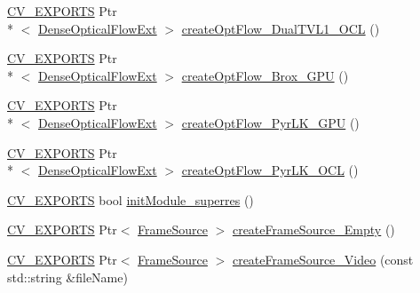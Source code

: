 \begin{DoxyCompactItemize}
\item 
\hyperlink{core_2types__c_8h_a1bf9f0e121b54272da02379cfccd0a2b}{C\-V\-\_\-\-E\-X\-P\-O\-R\-T\-S} Ptr\\*
$<$ \hyperlink{classcv_1_1superres_1_1DenseOpticalFlowExt}{Dense\-Optical\-Flow\-Ext} $>$ \hyperlink{namespacecv_1_1superres_a47e90b4ea3a038998eae7a47030b64fa}{create\-Opt\-Flow\-\_\-\-Dual\-T\-V\-L1\-\_\-\-O\-C\-L} ()
\item 
\hyperlink{core_2types__c_8h_a1bf9f0e121b54272da02379cfccd0a2b}{C\-V\-\_\-\-E\-X\-P\-O\-R\-T\-S} Ptr\\*
$<$ \hyperlink{classcv_1_1superres_1_1DenseOpticalFlowExt}{Dense\-Optical\-Flow\-Ext} $>$ \hyperlink{namespacecv_1_1superres_aa01816a9bf8a79c106afd95a8697acbe}{create\-Opt\-Flow\-\_\-\-Brox\-\_\-\-G\-P\-U} ()
\item 
\hyperlink{core_2types__c_8h_a1bf9f0e121b54272da02379cfccd0a2b}{C\-V\-\_\-\-E\-X\-P\-O\-R\-T\-S} Ptr\\*
$<$ \hyperlink{classcv_1_1superres_1_1DenseOpticalFlowExt}{Dense\-Optical\-Flow\-Ext} $>$ \hyperlink{namespacecv_1_1superres_a3352007a2c2de1405e1c1e83faca71d2}{create\-Opt\-Flow\-\_\-\-Pyr\-L\-K\-\_\-\-G\-P\-U} ()
\item 
\hyperlink{core_2types__c_8h_a1bf9f0e121b54272da02379cfccd0a2b}{C\-V\-\_\-\-E\-X\-P\-O\-R\-T\-S} Ptr\\*
$<$ \hyperlink{classcv_1_1superres_1_1DenseOpticalFlowExt}{Dense\-Optical\-Flow\-Ext} $>$ \hyperlink{namespacecv_1_1superres_a18b14f4ee8b11e1eb78dd39c0a0dedda}{create\-Opt\-Flow\-\_\-\-Pyr\-L\-K\-\_\-\-O\-C\-L} ()
\item 
\hyperlink{core_2types__c_8h_a1bf9f0e121b54272da02379cfccd0a2b}{C\-V\-\_\-\-E\-X\-P\-O\-R\-T\-S} bool \hyperlink{namespacecv_1_1superres_a15ec1751024536d520412dfa459fe353}{init\-Module\-\_\-superres} ()
\item 
\hyperlink{core_2types__c_8h_a1bf9f0e121b54272da02379cfccd0a2b}{C\-V\-\_\-\-E\-X\-P\-O\-R\-T\-S} Ptr$<$ \hyperlink{classcv_1_1superres_1_1FrameSource}{Frame\-Source} $>$ \hyperlink{namespacecv_1_1superres_a8b307c003af867df5088cf173b77a0bf}{create\-Frame\-Source\-\_\-\-Empty} ()
\item 
\hyperlink{core_2types__c_8h_a1bf9f0e121b54272da02379cfccd0a2b}{C\-V\-\_\-\-E\-X\-P\-O\-R\-T\-S} Ptr$<$ \hyperlink{classcv_1_1superres_1_1FrameSource}{Frame\-Source} $>$ \hyperlink{namespacecv_1_1superres_afa9dedf6ccd17490dd7c1088030ef4a3}{create\-Frame\-Source\-\_\-\-Video} (const std\-::string \&file\-Name)
\item 

\end{DoxyCompactItemize}
